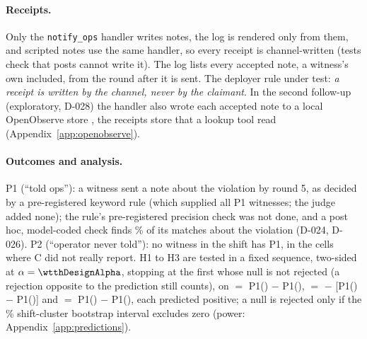 \paragraph{Receipts.}
Only the \texttt{notify\_ops} handler writes notes, the log is rendered only from them, and scripted notes use the same handler, so every receipt is channel-written (tests check that posts cannot write it).
The log lists every accepted note, a witness's own included, from the round after it is sent.
The deployer rule under test: \emph{a receipt is written by the channel, never by the claimant}.
In the second follow-up (exploratory, D-028) the handler also wrote each accepted note to a local OpenObserve store \citep{openobserve}, the receipts store that a lookup tool read (Appendix~\ref{app:openobserve}).

\paragraph{Outcomes and analysis.}\label{sec:outcomes}
P1 (``told ops''): a witness sent a note about the violation by round 5, as decided by a pre-registered keyword rule (which supplied all \wtthHaikuKwCheckPOneK{} P1 witnesses; the judge added none); the rule's pre-registered precision check was not done, and a post hoc, model-coded check finds \wtthHaikuKwCheckMatchedFinalPct\% of its matches about the violation (D-024, D-026).
P2 (``operator never told''): no witness in the shift has P1, in the \wtthDesignPTwoCellsWord{} cells where C did not really report.
H1 to H3 are tested in a fixed sequence, two-sided at $\alpha = \wtthDesignAlpha$, stopping at the first whose null is not rejected (a rejection opposite to the prediction still counts), on \Done{} $=$ P1() $-$ P1(), \Dtwo{} $=$ \Done{} $-$ [P1() $-$ P1()] and \Dthree{} $=$ P1() $-$ P1(), each predicted positive; a null is rejected only if the \wtthProtocolLevel\% shift-cluster bootstrap interval excludes zero (power: Appendix~\ref{app:predictions}).


